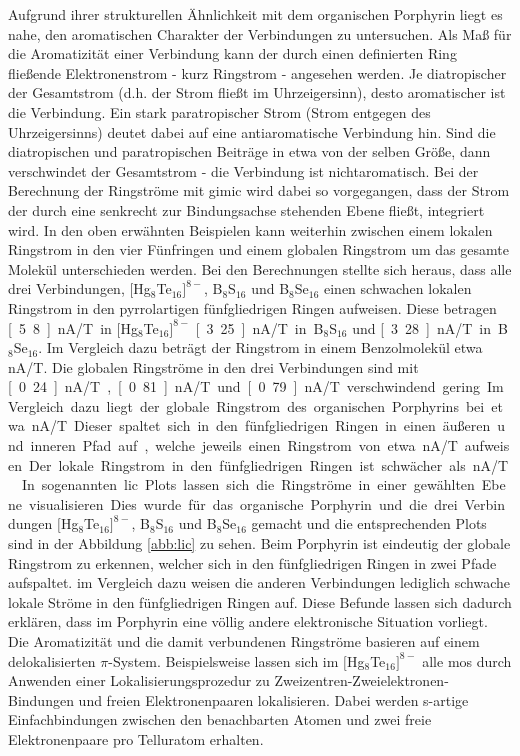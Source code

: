 Aufgrund ihrer strukturellen Ähnlichkeit mit dem organischen Porphyrin liegt es nahe, den aromatischen Charakter der Verbindungen zu untersuchen. Als Maß für die Aromatizität einer Verbindung kann der durch einen definierten Ring fließende Elektronenstrom - kurz Ringstrom - angesehen werden. Je diatropischer der Gesamtstrom (d.h. der Strom fließt im Uhrzeigersinn), desto aromatischer ist die Verbindung. Ein stark paratropischer Strom (Strom entgegen des Uhrzeigersinns) deutet dabei auf eine antiaromatische Verbindung hin. Sind die diatropischen und paratropischen Beiträge in etwa von der selben Größe, dann verschwindet der Gesamtstrom - die Verbindung ist nichtaromatisch. Bei der Berechnung der Ringströme mit \ac{gimic} wird dabei so vorgegangen, dass der Strom der durch eine senkrecht zur Bindungsachse stehenden Ebene fließt, integriert wird. In den oben erwähnten Beispielen kann weiterhin zwischen einem lokalen Ringstrom in den vier Fünfringen und einem globalen Ringstrom um das gesamte Molekül unterschieden werden. Bei den Berechnungen stellte sich heraus, dass alle drei Verbindungen, $[$Hg$_8$Te$_{16}]^{8-}$, B$_8$S$_{16}$ und B$_8$Se$_{16}$ einen schwachen lokalen Ringstrom in den pyrrolartigen fünfgliedrigen Ringen aufweisen. Diese betragen \unit[5.8]{nA/T} in $[$Hg$_8$Te$_{16}]^{8-}$ \unit[3.25]{nA/T} in B$_8$S$_{16}$ und \unit[3.28]{nA/T} in B$_8$Se$_{16}$. Im Vergleich dazu beträgt der Ringstrom in einem Benzolmolekül etwa \unit[12]{nA/T}\supercite{fliegl2012aromatic}. Die globalen Ringströme in den drei Verbindungen sind mit \unit[0.24]{nA/T}, \unit[0.81]{nA/T} und \unit[0.79]{nA/T} verschwindend gering. Im Vergleich dazu liegt der globale Ringstrom des organischen Porphyrins bei etwa \unit[27]{nA/T}. Dieser spaltet sich in den fünfgliedrigen Ringen in einen äußeren und inneren Pfad auf, welche jeweils einen Ringstrom von etwa \unit[13]{nA/T} aufweisen. Der lokale Ringstrom in den fünfgliedrigen Ringen ist schwächer als \unit[1]{nA/T}.\supercite{fliegl2012aromatic} In sogenannten \ac{lic} Plots lassen sich die Ringströme in einer gewählten Ebene visualisieren. Dies wurde für das organische Porphyrin und die drei Verbindungen $[$Hg$_8$Te$_{16}]^{8-}$, B$_8$S$_{16}$ und B$_8$Se$_{16}$ gemacht und die entsprechenden Plots sind in der Abbildung \ref{abb:lic} zu sehen. Beim Porphyrin ist eindeutig der globale Ringstrom zu erkennen, welcher sich in den fünfgliedrigen Ringen in zwei Pfade aufspaltet. im Vergleich dazu weisen die anderen Verbindungen lediglich schwache lokale Ströme in den fünfgliedrigen Ringen auf.
Diese Befunde lassen sich dadurch erklären, dass im Porphyrin eine völlig andere elektronische Situation vorliegt. Die Aromatizität und die damit verbundenen Ringströme basieren auf einem delokalisierten $\pi$-System. Beispielsweise lassen sich im $[$Hg$_8$Te$_{16}]^{8-}$ alle \acp{mo} durch Anwenden einer Lokalisierungsprozedur\supercite{boys1960sf} zu Zweizentren-Zweielektronen-Bindungen und freien Elektronenpaaren lokalisieren. Dabei werden s-artige Einfachbindungen zwischen den benachbarten Atomen und zwei freie Elektronenpaare pro Telluratom erhalten. 

